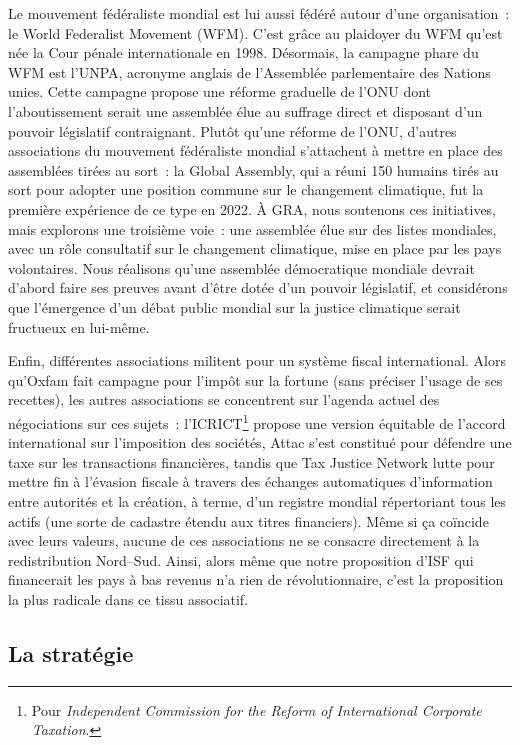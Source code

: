 \documentclass[a5paper,french,openany]{memoir}
\begin{document}
Le mouvement fédéraliste mondial est lui aussi fédéré autour d'une organisation~: le World Federalist Movement (WFM). C'est grâce au plaidoyer du WFM qu'est née la Cour pénale internationale en 1998. Désormais, la campagne phare du WFM est l'UNPA, acronyme anglais de l'Assemblée parlementaire des Nations unies. Cette campagne propose une réforme graduelle de l'ONU dont l'aboutissement serait une assemblée élue au suffrage direct et disposant d'un pouvoir législatif contraignant. Plutôt qu'une réforme de l'ONU, d'autres associations du mouvement fédéraliste mondial s'attachent à mettre en place des assemblées tirées au sort~: la Global Assembly, qui a réuni 150 humains tirés au sort pour adopter une position commune sur le changement climatique, fut la première expérience de ce type en 2022. À GRA, nous soutenons ces initiatives, mais explorons une troisième voie~: une assemblée élue sur des listes mondiales, avec un rôle consultatif sur le changement climatique, mise en place par les pays volontaires. Nous réalisons qu'une assemblée démocratique mondiale devrait d'abord faire ses preuves avant d'être dotée d'un pouvoir législatif, et considérons que l'émergence d'un débat public mondial sur la justice climatique serait fructueux en lui-même. 

Enfin, différentes associations militent pour un système fiscal international. Alors qu'Oxfam fait campagne pour l'impôt sur la fortune (sans préciser l'usage de ses recettes), les autres associations se concentrent sur l'agenda actuel des négociations sur ces sujets~: l'ICRICT\footnote{Pour \textit{Independent Commission for the Reform of International Corporate Taxation}.} 
propose une version équitable de l'accord international sur l'imposition des sociétés, Attac s'est constitué pour défendre une taxe sur les transactions financières, tandis que Tax Justice Network lutte pour mettre fin à l'évasion fiscale à travers des échanges automatiques d'information entre autorités et la création, à terme, d'un registre mondial répertoriant tous les actifs (une sorte de cadastre étendu aux titres financiers). Même si ça coïncide avec leurs valeurs, aucune de ces associations ne se consacre directement à la redistribution Nord--Sud. Ainsi, alors même que notre proposition d'ISF qui financerait les pays à bas revenus n'a rien de révolutionnaire, c'est la proposition la plus radicale dans ce tissu associatif. 

\subsection{La stratégie}
\end{document}
